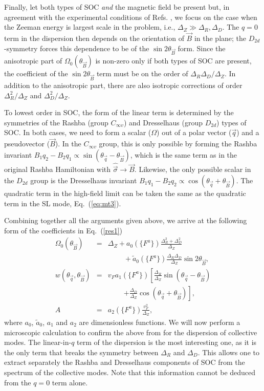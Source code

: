 \documentclass[prb,aps,twocolumn]{revtex4}
\newcommand{\bea}{\begin{eqnarray}}
\newcommand{\eea}{\end{eqnarray}}
\newcommand{\bq}{{\vec q}}
\newcommand{\bB}{{\vec B}}
\newcommand{\nn}{\nonumber}
\begin{document}
Finally, let both types of SOC {\em and} the magnetic field be
present but, in agreement with the experimental conditions of
Refs. , {we focus on the case when the
Zeeman energy is largest scale in the problem, i.e.,
}$\Delta_Z\gg\Delta_R,\Delta_D$. The $q=0$ term in the dispersion
then depends on the orientation of $\bB$ in the plane; the
$D_{2d}$-symmetry forces this dependence to be of {the} $\sin
2\theta_\bB$ form. Since the anisotropic part of
$\Omega_0(\theta_\bB)$ is non-zero only if both types of SOC are
present, the coefficient of the $\sin 2\theta_\bB$ term must be on
the order of $\Delta_R\Delta_D/\Delta_Z$. In addition to the
anisotropic part, there are also isotropic corrections of order
$\Delta_R^2/\Delta_Z$ and $\Delta_D^2/\Delta_Z$.

To lowest order in SOC, the form of the linear term is determined
by the symmetries of the Rashba (group $C_{\infty v}$) and
Dresselhaus (group $D_{2d}$) types of SOC. In both cases, we need
to form a scalar ($\Omega$) out of a polar vector ($\bq$) and a
pseudovector ($\bB$). In the $C_{\infty v}$ group, this is only
possible by forming the Rashba invariant $B_1q_2-B_2q_1\propto
\sin(\theta_\bq-\theta_\bB)$, which is the same term as in the
original Rashba Hamiltonian with $\hat{\vec\sigma}\to \bB$.
Likewise, the only possible scalar in the $D_{2d}$ group is the
Dresselhaus invariant $B_1q_1-B_2q_2\propto
\cos(\theta_\bq+\theta_\bB)$. The quadratic term in the high-field
limit can be taken the same as the quadratic term in the SL mode,
Eq.~(\ref{eq:mt3}).\cite{FN2}

Combining together all the arguments given above, we arrive at the
following form of the coefficients in Eq.~(\ref{res1}) \bea
\Omega_0(\theta_{\bB})&=&\Delta_Z+a_0(\{F^a\})\frac{\Delta_R^2+\Delta_D^2}{\Delta_Z}\nn\\
&&~~~~~~~~~~+\tilde a_{0}(\{F^a\}) \frac{\Delta_R\Delta_D}{\Delta_Z}\sin2\theta_\bB,\nn\\
w(\theta_\bq,\theta_\bB)&=&v_Fa_1(\{F^a\})\left[\frac{\Delta_R}{\Delta_Z}
\sin(\theta_\bq-\theta_\bB)\right.\nn\\
&&~~~~~~~~~~\left.+\frac{\Delta_D}{\Delta_Z}\cos(\theta_\bq+\theta_\bB)\right],\nn\\
A&=&a_2(\{F^a\})\frac{v_F^2}{\Delta_Z}, \label{conj} \eea where
$a_0$, $\tilde a_0$, $a_1$ and $a_2$ are dimensionless functions.
We will now perform a microscopic calculation to confirm the above
from for the dispersion of collective modes. The linear-in-$q$
term of the dispersion is the most interesting one, as it is the
only term that breaks the symmetry between $\Delta_R$ and
$\Delta_D$. This allows one to extract separately the Rashba and
Dresselhaus components of SOC from the spectrum of the collective
modes. Note that this information cannot be deduced from the $q=0$
term alone.
\end{document}
